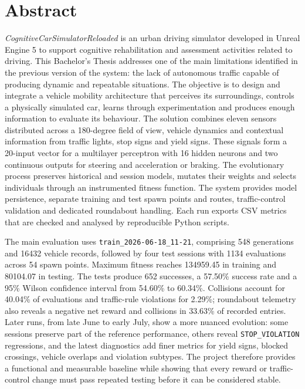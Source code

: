 \cleardoublepage
\chapter*{Abstract}

\textit{CognitiveCarSimulatorReloaded} is an urban driving simulator developed in Unreal Engine 5 to support cognitive rehabilitation and assessment activities related to driving. This Bachelor's Thesis addresses one of the main limitations identified in the previous version of the system: the lack of autonomous traffic capable of producing dynamic and repeatable situations. The objective is to design and integrate a vehicle mobility architecture that perceives its surroundings, controls a physically simulated car, learns through experimentation and produces enough information to evaluate its behaviour. The solution combines eleven sensors distributed across a 180-degree field of view, vehicle dynamics and contextual information from traffic lights, stop signs and yield signs. These signals form a 20-input vector for a multilayer perceptron with 16 hidden neurons and two continuous outputs for steering and acceleration or braking. The evolutionary process preserves historical and session models, mutates their weights and selects individuals through an instrumented fitness function. The system provides model persistence, separate training and test spawn points and routes, traffic-control validation and dedicated roundabout handling. Each run exports CSV metrics that are checked and analysed by reproducible Python scripts.

The main evaluation uses \texttt{train\_2026-06-18\_11-21}, comprising 548 generations and 16432 vehicle records, followed by four test sessions with 1134 evaluations across 54 spawn points. Maximum fitness reaches 134959.45 in training and 80104.07 in testing. The tests produce 652 successes, a 57.50\% success rate and a 95\% Wilson confidence interval from 54.60\% to 60.34\%. Collisions account for 40.04\% of evaluations and traffic-rule violations for 2.29\%; roundabout telemetry also reveals a negative net reward and collisions in 33.63\% of recorded entries. Later runs, from late June to early July, show a more nuanced evolution: some sessions preserve part of the reference performance, others reveal \texttt{STOP\_VIOLATION} regressions, and the latest diagnostics add finer metrics for yield signs, blocked crossings, vehicle overlaps and violation subtypes. The project therefore provides a functional and measurable baseline while showing that every reward or traffic-control change must pass repeated testing before it can be considered stable.
